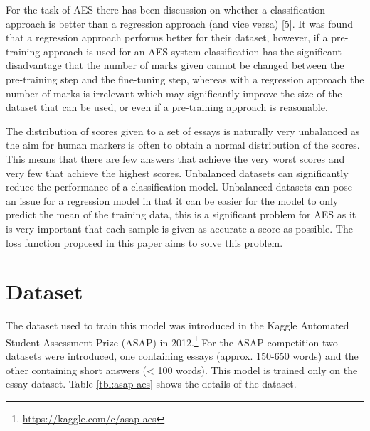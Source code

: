 For the task of AES there has been discussion on whether a
classification approach is better than a regression approach (and vice
versa) {[}5{]}. It was found that a regression approach performs better
for their dataset, however, if a pre-training approach is used for an
AES system classification has the significant disadvantage that the
number of marks given cannot be changed between the pre-training step
and the fine-tuning step, whereas with a regression approach the number
of marks is irrelevant which may significantly improve the size of the
dataset that can be used, or even if a pre-training approach is
reasonable.

The distribution of scores given to a set of essays is naturally very
unbalanced as the aim for human markers is often to obtain a normal
distribution of the scores. This means that there are few answers that
achieve the very worst scores and very few that achieve the highest
scores. Unbalanced datasets can significantly reduce the performance of
a classification model. Unbalanced datasets can pose an issue for a
regression model in that it can be easier for the model to only predict
the mean of the training data, this is a significant problem for AES as
it is very important that each sample is given as accurate a score as
possible. The loss function proposed in this paper aims to solve this
problem.

\hypertarget{dataset}{%
\section{Dataset}\label{dataset}}

The dataset used to train this model was introduced in the Kaggle
Automated Student Assessment Prize (ASAP) in 2012.\footnote{\url{https://kaggle.com/c/asap-aes}}
For the ASAP competition two datasets were introduced, one containing
essays (approx. 150-650 words) and the other containing short answers
(\textless{} 100 words). This model is trained only on the essay
dataset. Table \ref{tbl:asap-aes} shows the details of the dataset.

